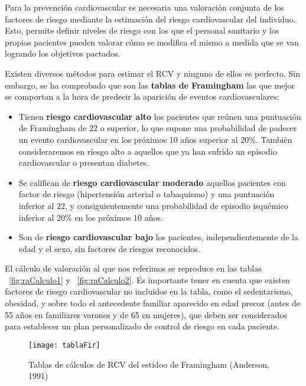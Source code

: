 Para la prevención cardiovascular es necesaria una valoración conjunta de los factores de riesgo mediante la estimación del riesgo cardiovascular del individuo. Esto, permite definir niveles de riesgo con los que el personal sanitario y los propios pacientes pueden valorar cómo se modifica el mismo a medida que se van logrando los objetivos pactados.

Existen diversos métodos para estimar el RCV y ninguno de ellos es perfecto. Sin embargo, se ha comprobado que son las\textbf{ tablas de
Framingham } las que mejor se comportan a la hora de predecir la aparición de eventos cardiovasculares:

\begin{itemize}
\item Tienen \textbf{riesgo cardiovascular alto} los pacientes que reúnen una puntuación de Framingham de 22 o superior, lo que supone una probabilidad de padecer un evento cardiovascular en los próximos 10 años superior al 20\%. También consideraremos en riesgo alto a aquellos que ya han sufrido un episodio cardiovascular o presentan diabetes. 

\item Se califican de \textbf{riesgo cardiovascular moderado} aquellos pacientes con factor de riesgo (hipertensión arterial o tabaquismo) y una puntuación inferior al 22, y consiguientemente una probabilidad de episodio isquémico inferior al 20\% en los próximos 10 años.

\item Son de \textbf{riesgo cardiovascular bajo} los pacientes, independientemente de la edad y el sexo, sin factores de riesgos reconocidos. 
\end{itemize}

El cálculo de valoración al que nos referimos se reproduce en las tablas ~\ref{fig:raCalculo1} y ~\ref{fig:raCalculo2}. Es importante tener en cuenta que existen factores de riesgo cardiovascular no incluidos en la tabla, como el sedentarismo, obesidad, y sobre todo el antecedente familiar aparecido en edad precoz (antes de 55 años en familiares varones y de 65 en mujeres), que deben ser considerados para establecer un plan personalizado de control de riesgo en cada paciente.  
\begin{figure}[htb]
	\centering
	\texttt{[image: tablaFir]} 
	\caption[Tabla Framighan]{Tablas de cálculos de RCV del estidoo de Framingham (Anderson, 1991) \cite{tagle2007estimacion}
	}
	\label{fig:tablaFir1}
\end{figure}

